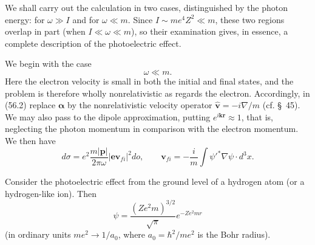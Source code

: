 We shall carry out the calculation in two cases, distinguished by the photon energy: for $\omega\gg I$ and for $\omega\ll m$. Since $I\sim me^4Z^2\ll m$, these two regions overlap in part (when $I\ll\omega\ll m$), so their examination gives, in essence, a complete description of the photoelectric effect.

We begin with the case
\begin{equation}
\omega\ll m.
\tag{56.4}
\end{equation}
Here the electron velocity is small in both the initial and final states, and the problem is therefore wholly nonrelativistic as regards the electron. Accordingly, in (56.2) replace $\boldsymbol\alpha$ by the nonrelativistic velocity operator $\hat{\mathbf v}=-i\nabla/m$%
(cf. \S~45). We may also pass to the dipole approximation, putting $e^{i\mathbf k\mathbf r}\approx1$, that is, neglecting the photon momentum in comparison with the electron momentum. We then have
\begin{equation}
d\sigma=e^2\frac{m|\mathbf p|}{2\pi\omega}
|\mathbf e\mathbf v_{fi}|^2do,\qquad
\mathbf v_{fi}=-\frac im\int\psi'^*\nabla\psi\cdot d^3x.
\tag{56.5}
\end{equation}

Consider the photoelectric effect from the ground level of a hydrogen atom (or a hydrogen-like ion). Then
\begin{equation}
\psi=\frac{(Ze^2m)^{3/2}}{\sqrt\pi}e^{-Ze^2mr}
\tag{56.6}
\end{equation}
(in ordinary units $me^2\to1/a_0$, where $a_0=\hbar^2/me^2$ is the Bohr radius).

